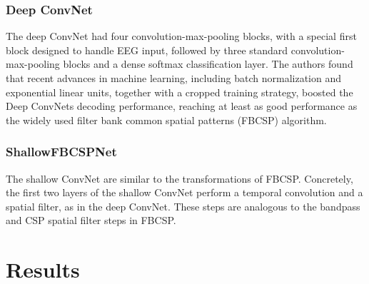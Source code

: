 \documentclass[runningheads]{llncs}
\begin{document}
\subsubsection{Deep ConvNet}
The deep ConvNet had four convolution-max-pooling blocks, with a special first block designed to handle EEG input, followed by three standard convolution-max-pooling blocks and a dense softmax classification layer. The authors found that recent advances in machine learning, including batch normalization and exponential linear units, together with a cropped training strategy, boosted the Deep ConvNets decoding performance, reaching at least as good performance as the widely used filter bank common spatial patterns (FBCSP) algorithm.


\subsubsection{ShallowFBCSPNet}
The shallow ConvNet are similar to the transformations of FBCSP. Concretely, the first two layers of the shallow ConvNet perform a temporal convolution and a spatial filter, as in the deep ConvNet. These steps are analogous to the bandpass and CSP spatial filter steps in FBCSP.

\section{Results}





\end{document}
